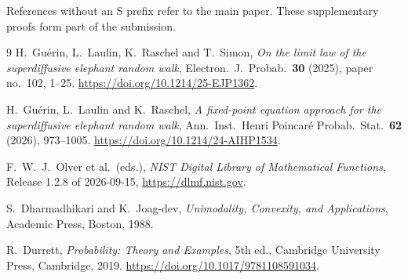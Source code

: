 \documentclass[EJP,preprint]{ejpecp}
\begin{document}
\raggedbottom
References without an S prefix refer to the main paper.
These supplementary proofs form part of the submission.



\begin{thebibliography}{9}
H.~Gu\'erin, L.~Laulin, K.~Raschel and T.~Simon, \emph{On the limit law of
the superdiffusive elephant random walk}, Electron.\ J.\ Probab.\
\textbf{30} (2025), paper no.~102, 1--25. \url{https://doi.org/10.1214/25-EJP1362}.

H.~Gu\'erin, L.~Laulin and K.~Raschel, \emph{A fixed-point equation approach
for the superdiffusive elephant random walk}, Ann.\ Inst.\ Henri Poincar\'e
Probab.\ Stat.\ \textbf{62} (2026), 973--1005.
\url{https://doi.org/10.1214/24-AIHP1534}.

F.~W.~J.~Olver et al.\ (eds.), \emph{NIST Digital Library of Mathematical
Functions}, Release 1.2.8 of 2026-09-15, \url{https://dlmf.nist.gov}.

S.~Dharmadhikari and K.~Joag-dev, \emph{Unimodality, Convexity, and
Applications}, Academic Press, Boston, 1988.

R.~Durrett, \emph{Probability: Theory and Examples}, 5th ed., Cambridge University
Press, Cambridge, 2019.
\url{https://doi.org/10.1017/9781108591034}.

\end{thebibliography}
\end{document}

